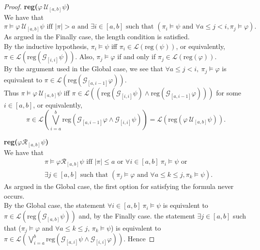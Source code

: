 \documentclass[runningheads]{llncs}
\renewcommand{\phi}{\varphi}
\begin{document}
\begin{proof}
 \noindent \textbf{reg($\varphi \ \mathcal{U}_{[a,b]} \psi$)}\\
  We have that 
  $$\pi \vDash \varphi \ \mathcal{U}_{[a,b]} \psi \text{ iff } |\pi| > a \text{ and } \exists i \in [a,b] \text{ such that } (\pi_i \vDash \psi \text{ and } \forall a \leq j < i, \pi_j \vDash \varphi).$$
  As argued in the Finally case, the length condition is satisfied.\\
  By the inductive hypothesis, $\pi_i \vDash \psi$ iff $\pi_i \in \mathscr{L}(\text{reg}(\psi))$, or equivalently, \\
  $\pi \in \mathscr{L}(\text{reg}(\mathcal{G}_{[i,i]} \psi))$. Also, $\pi_j \vDash \varphi$ if and only if $\pi_j \in \mathscr{L}(\text{reg}(\varphi))$.\\
  By the argument used in the Global case, we see that $\forall a \leq j < i, \ \pi_j \vDash \varphi$ is equivalent to $\pi \in \mathscr{L}(\text{reg}(\mathcal{G}_{[a, i-1]} \varphi))$.\\
  Thus $\pi \vDash \varphi \ \mathcal{U}_{[a,b]} \psi$ iff $\pi \in \mathscr{L}((\text{reg}(\mathcal{G}_{[i,i]} \psi) \land \text{reg}( \mathcal{G}_{[a, i-1]} \varphi)))$ for some $i \in [a,b]$, or equivalently, 
  $$\pi \in \mathscr{L}\left(\bigvee_{i=a}^{b} \text{reg}\left(\mathcal{G}_{[a,i-1]}\phi \land \mathcal{G}_{[i, i]} \psi\right)\right) = \mathscr{L}\left(\text{reg}(\varphi \ \mathcal{U}_{[a,b]} \psi)\right).$$
  
  \noindent \textbf{reg($\varphi \mathcal{R}_{[a,b]} \psi$)}\\
  We have that
  \begin{align*}
    &\pi \vDash \varphi \mathcal{R}_{[a,b]} \psi \text{ iff } |\pi| \leq a \text{ or } \forall i \in [a,b] \ \pi_i \vDash \psi \text{ or } \\ 
    &\exists j\in[a,b] \text{ such that }
    (\pi_j \vDash \varphi \text{ and } \forall a\leq k \leq j, \pi_k \vDash \psi).
  \end{align*}
  As argued in the Global case, the first option for satisfying the formula never occurs.\\
  By the Global case, the statement $\forall i\in[a,b] \ \pi_i \vDash \psi$ is equivalent to $\pi \in \mathscr{L}(\text{reg}(\mathcal{G}_{[a,b]} \psi))$ and, by the Finally case. the statement $\exists j\in[a,b]$ such that ($\pi_j \vDash \varphi$ and $\forall a\leq k \leq j$, $\pi_k \vDash \psi$) is equivalent to $\pi \in \mathscr{L}\left(\bigvee_{i=a}^{b} \text{reg}\left(\mathcal{G}_{[a,i]}\psi \land \mathcal{G}_{[i, i]} \phi\right)\right)$. Hence 
  

\end{proof}
\end{document}
